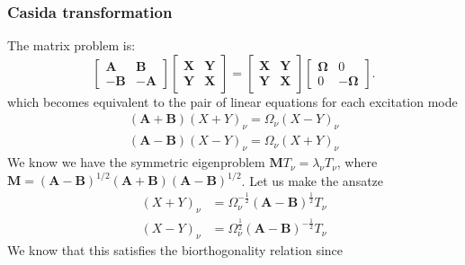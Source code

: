 \begin{tcolorbox}[colback=red!10!white, colframe=red!50!black, title=Exercise]
\subsubsection{Casida transformation}
The matrix problem is:
\begin{equation}
\begin{bmatrix}
\textbf{A} & \textbf{B} \\
-\textbf{B} & -\textbf{A}
\end{bmatrix}
\begin{bmatrix}
\textbf{X}&\textbf{Y} \\
\textbf{Y} &\textbf{X}
\end{bmatrix}
= 
\begin{bmatrix}
\textbf{X} & \textbf{Y}\\
\textbf{Y} & \textbf{X}
\end{bmatrix}
\begin{bmatrix}
\boldsymbol{\Omega } & 0 \\
0 & -\boldsymbol{\Omega }
\end{bmatrix}
.
\end{equation}
which becomes equivalent to the pair of linear equations for each excitation mode
\begin{equation}
\begin{split}
    \left(\textbf{A} + \textbf{B}\right) \left(X + {Y}\right)_\nu = \Omega_\nu \left({X} - {Y}\right)_\nu \\
    \left(\textbf{A} - \textbf{B}\right) \left(X - {Y}\right)_\nu = \Omega_\nu \left(X + {Y}\right)_\nu
\label{eqn:A_B}
\end{split}
\end{equation}
We know we have the symmetric eigenproblem $\bm{M}T_\nu = \lambda_\nu T_\nu$, where $\bm{M}=(\bm{A}-\bm{B})^{1/2}(\bm{A}+\bm{B})(\bm{A}-\bm{B})^{1/2}$. Let us make the ansatze 
\begin{equation}
\begin{split}
    \left({X} + {Y}\right)_\nu &= {\Omega }_\nu^{-\frac{1}{2}} \left(\textbf{A}-\textbf{B}\right)^{\frac{1}{2}}T_\nu \\
    \left({X} - {Y}\right)_\nu &= {\Omega }_\nu^{\frac{1}{2}} \left(\textbf{A}-\textbf{B}\right)^{-\frac{1}{2}}T_\nu
\label{eqn:XY_ansatz}
\end{split}
\end{equation}
We know that this satisfies the biorthogonality relation since
\begin{equation}

\end{equation}
\end{tcolorbox}
